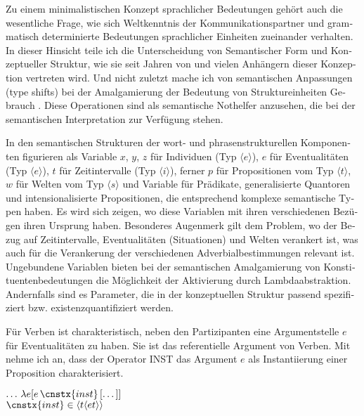 \documentclass[output=paper, colorlinks, citecolor=brown, booklanguage=german]{langscibook}
\begin{document}
\begin{otherlanguage}{german}
Zu einem minimalistischen Konzept sprachlicher Bedeutungen gehört auch die wesentliche Frage, wie sich Weltkenntnis der Kommunikationspartner und grammatisch determinierte Bedeutungen sprachlicher Einheiten zueinander verhalten. In dieser Hinsicht teile ich die Unterscheidung von Semantischer Form und Konzeptueller Struktur, wie sie seit Jahren von \citet{Bierwisch-Lang1987,Dolling1997,Bierwisch2007,Lang-Maienborn2011} und vielen Anhängern dieser Konzeption vertreten wird. Und nicht zuletzt mache ich von semantischen Anpassungen (type shifts) bei der Amalgamierung der Bedeutung von Struktureinheiten Gebrauch \citep{Partee1987}. Diese Operationen sind als semantische Nothelfer anzusehen, die bei der semantischen Interpretation zur Verfügung stehen.

In den semantischen Strukturen der wort- und phrasenstrukturellen Komponenten figurieren als Variable $x$, $y$, $z$ für Individuen (Typ $\langle e \rangle$), $e$ für Eventualitäten (Typ $\langle e \rangle$), $t$ für Zeitintervalle (Typ $\langle i \rangle$), ferner $p$ für Propositionen vom Typ $\langle t \rangle$, $w$ für Welten vom Typ $\langle s \rangle$ und Variable für Prädikate, generalisierte Quantoren und intensionalisierte Propositionen, die entsprechend komplexe semantische Typen haben. Es wird sich zeigen, wo diese Variablen mit ihren verschiedenen Bezügen ihren Ursprung haben. Besonderes Augenmerk gilt dem Problem, wo der Bezug auf Zeitintervalle, Eventualitäten (Situationen) und Welten verankert ist, was auch für die Verankerung der verschiedenen Adverbialbestimmungen relevant ist. Ungebundene Variablen bieten bei der semantischen Amalgamierung von Konstituentenbedeutungen die Möglichkeit der Aktivierung durch Lambdaabstraktion. Andernfalls sind es Parameter, die in der konzeptuellen Struktur passend spezifiziert bzw. existenzquantifiziert werden.

Für Verben ist charakteristisch, neben den Partizipanten eine Argumentstelle $e$ für Eventualitäten zu haben. Sie ist das referentielle Argument von Verben. Mit \citet{Bierwisch-Lang1987} nehme ich an, dass der Operator INST das Argument $e$ als Instantiierung einer Proposition charakterisiert.


\ea\label{ex:18:6} $\dots\,\lambda e[e\,\cnstx{inst}\,[\dots]]$\\
$\cnstx{inst}\in \langle t \langle et \rangle\rangle$
\z



\end{otherlanguage}
\end{document}
